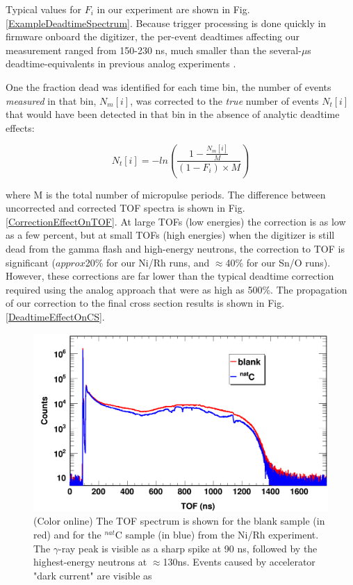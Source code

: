 \documentclass[twocolumn,secnumarabic,amssymb, nobibnotes, aps, prl,
superscriptaddress, nobalancelastpage]{revtex4}
\begin{document}
Typical values for $F_{i}$ in our experiment are shown in Fig.
\ref{ExampleDeadtimeSpectrum}. Because trigger processing is done quickly in
firmware onboard the digitizer, the per-event deadtimes affecting our
measurement ranged from 150-230 ns, much smaller than the several-$\mu$s
deadtime-equivalents in previous analog experiments \cite{Finlay1993,
Abfalterer2001}.

One the fraction dead was identified for each time bin, the number of events
\textit{measured} in that bin, $N_{m}[i]$, was corrected to the \textit{true}
number of events $N_{t}[i]$ that would have been detected in that bin in the absence of
analytic deadtime effects:

\begin{equation}
    N_{t}[i] = -ln\left(\frac{1-\frac{N_m[i]}{M}}{(1-F_{i})\times M}\right)
\end{equation}

where M is the total number of micropulse periods. The difference between
uncorrected and corrected TOF spectra is shown in Fig.
\ref{CorrectionEffectOnTOF}. At large TOFs (low energies) the correction is as low as a
few percent, but at small TOFs (high energies) when the digitizer is still dead
from the gamma flash and high-energy neutrons, the correction to TOF is significant
($approx$20\% for our Ni/Rh runs, and $\approx$40\% for our Sn/O runs). However, these corrections are far lower than the typical
deadtime correction required using the analog approach \cite{Finlay1993,
Abfalterer2001} that were as high as 500\%. The propagation of our correction to the final 
cross section results is shown in Fig. \ref{DeadtimeEffectOnCS}.

\begin{figure}
    \includegraphics[scale=0.3]{figures/exampleTOFSpectrum.png}
    \caption{(Color online) The TOF spectrum is shown for the blank sample (in
        red) and for the $^{nat}$C sample (in blue) from the Ni/Rh experiment.
        The $\gamma$-ray peak is visible as a sharp spike at 90 ns, followed by
        the highest-energy neutrons at $\approx$130ns. Events caused by accelerator 
        "dark current" are visible as 
    }
    \label{ExampleTOFSpectrum}
\end{figure}
\end{document}
